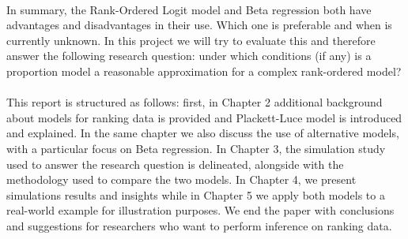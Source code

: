 \\
In summary, the Rank-Ordered Logit model and  Beta regression both have advantages and disadvantages in their use. Which one is preferable and when is currently unknown. In this project we will try to evaluate this and therefore answer the following research question: under which conditions (if any) is a proportion model a reasonable approximation for a complex rank-ordered model? \\
\\
This report is structured as follows: first, in Chapter 2  additional background about models for ranking data is provided and Plackett-Luce model is introduced and explained. In the same chapter we also discuss the use of alternative  models, with a particular focus on Beta regression. In Chapter 3, the simulation study  used to answer the research question is delineated, alongside with the  methodology used to compare the two models. In Chapter 4, we present simulations results and insights while in Chapter 5 we apply both models to a real-world example for illustration purposes. We end the paper with conclusions and suggestions for researchers who want to perform inference on ranking data.
